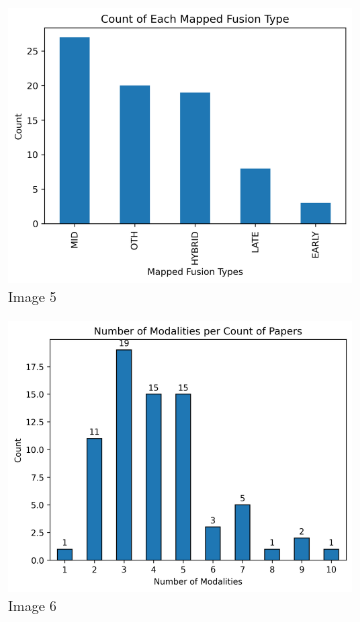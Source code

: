 \documentclass[manuscript,screen,review]{acmart}
\begin{document}
\begin{figure}[h!]
    \begin{subfigure}[b]{0.33\textwidth}
        \includegraphics[width=\textwidth]{img/statistical_imgs/fusion_type with OTH.png}
        \caption{Image 5}
    \end{subfigure}
    \hfill
    \begin{subfigure}[b]{0.33\textwidth}
        \includegraphics[width=\textwidth]{img/statistical_imgs/number of modalities per count of papers.png}
        \caption{Image 6}
    \end{subfigure}
    \hfill
    \begin{subfigure}[b]{0.33\textwidth}

\end{subfigure}
\end{figure}
\end{document}

